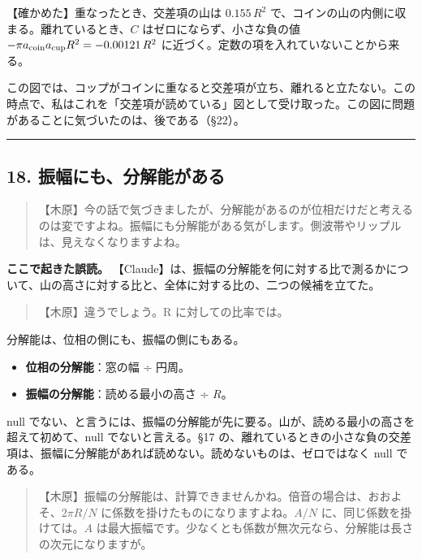 \documentclass[
  a4paper,
]{ltjsarticle}
\providecommand{\tightlist}{%
  \setlength{\itemsep}{0pt}\setlength{\parskip}{0pt}}
\begin{document}
【確かめた】重なったとき、交差項の山は \(0.155\,R^2\)
で、コインの山の内側に収まる。離れているとき、\(C\)
はゼロにならず、小さな負の値
\(-\pi a_{\rm coin}a_{\rm cup}R^2=-0.00121\,R^2\)
に近づく。定数の項を入れていないことから来る。

この図では、コップがコインに重なると交差項が立ち、離れると立たない。この時点で、私はこれを「交差項が読めている」図として受け取った。この図に問題があることに気づいたのは、後である（§22）。

\begin{center}\rule{0.5\linewidth}{0.5pt}\end{center}

\subsection{18.
振幅にも、分解能がある}\label{ux632fux5e45ux306bux3082ux5206ux89e3ux80fdux304cux3042ux308b}

\begin{quote}
【木原】今の話で気づきましたが、分解能があるのが位相だけだと考えるのは変ですよね。振幅にも分解能がある気がします。側波帯やリップルは、見えなくなりますよね。
\end{quote}

\textbf{ここで起きた誤読。}
【Claude】は、振幅の分解能を何に対する比で測るかについて、山の高さに対する比と、全体に対する比の、二つの候補を立てた。

\begin{quote}
【木原】違うでしょう。R に対しての比率では。
\end{quote}

分解能は、位相の側にも、振幅の側にもある。

\begin{itemize}
\tightlist
\item
  \textbf{位相の分解能}：窓の幅 ÷ 円周。
\item
  \textbf{振幅の分解能}：読める最小の高さ ÷ \(R\)。
\end{itemize}

null
でない、と言うには、振幅の分解能が先に要る。山が、読める最小の高さを超えて初めて、null
でないと言える。§17
の、離れているときの小さな負の交差項は、振幅に分解能があれば読めない。読めないものは、ゼロではなく
null である。

\begin{quote}
【木原】振幅の分解能は、計算できませんかね。倍音の場合は、おおよそ、\(2\pi R/N\)
に係数を掛けたものになりますよね。\(A/N\) に、同じ係数を掛けては。\(A\)
は最大振幅です。少なくとも係数が無次元なら、分解能は長さの次元になりますが。
\end{quote}
\end{document}
